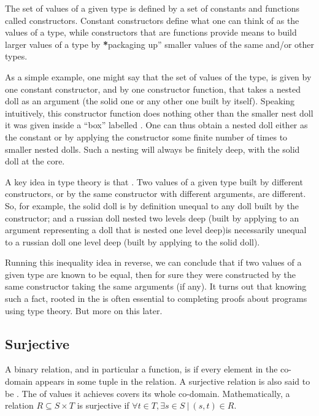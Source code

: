 \documentclass[letterpaper,10pt,english]{sphinxmanual}
\begin{document}
The set of values of a given type is defined by a set of constants and
functions called constructors. Constant constructors define what one
can think of as the  values of a type, while constructors
that are functions provide means to build larger values of a type by
{\color{red}\bfseries{}*}packaging up” smaller values of the same and/or other types.

As a simple example, one might say that the set of values of the type,
 is given by one constant constructor,  and
by one constructor function,  that takes a nested doll as an
argument (the solid one or any other one built by  itself).
Speaking intuitively, this constructor function does nothing other
than  the smaller nest doll it was given inside a “box”
labelled .  One can thus obtain a nested doll either as the
constant  or by applying the  constructor some
finite number of times to smaller nested dolls. Such a nesting will
always be finitely deep, with the solid doll at the core.

A key idea in type theory is that . Two
values of a given type built by different constructors, or by the same
constructor with different arguments, are  different. So, for
example, the solid doll is by definition unequal to any doll built by
the  constructor; and a russian doll nested two levels deep
(built by applying  to an argument representing a doll that
is nested one level deep)is necessarily unequal to a russian doll one
level deep (built by applying  to the solid doll).

Running this inequality idea in reverse, we can conclude that if two
values of a given type are known to be equal, then for sure they were
constructed by the same constructor taking the same arguments (if
any).  It turns out that knowing such a fact, rooted in the
 is often essential to completing proofs
about programs using type theory. But more on this later.


\subsection{Surjective}
\label{\detokenize{07-set-theory:surjective}}
A binary relation, and in particular a function, is  if
every element in the co-domain appears in some tuple in the relation.
A surjective relation is also said to be . The  of values
it achieves covers its whole co-domain. Mathematically, a relation
\(R \subseteq S \times T\) is surjective if \(\forall t \in
T, \exists s \in S~|~(s,t) \in R\).
\end{document}
